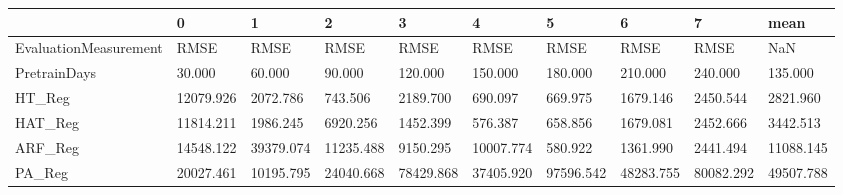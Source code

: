 \begin{tabular}{llllllllll}
\toprule
{} &         0 &         1 &         2 &         3 &         4 &         5 &         6 &         7 &      mean \\
\midrule
EvaluationMeasurement &      RMSE &      RMSE &      RMSE &      RMSE &      RMSE &      RMSE &      RMSE &      RMSE &       NaN \\
PretrainDays          &    30.000 &    60.000 &    90.000 &   120.000 &   150.000 &   180.000 &   210.000 &   240.000 &   135.000 \\
HT\_Reg                & 12079.926 &  2072.786 &   743.506 &  2189.700 &   690.097 &   669.975 &  1679.146 &  2450.544 &  2821.960 \\
HAT\_Reg               & 11814.211 &  1986.245 &  6920.256 &  1452.399 &   576.387 &   658.856 &  1679.081 &  2452.666 &  3442.513 \\
ARF\_Reg               & 14548.122 & 39379.074 & 11235.488 &  9150.295 & 10007.774 &   580.922 &  1361.990 &  2441.494 & 11088.145 \\
PA\_Reg                & 20027.461 & 10195.795 & 24040.668 & 78429.868 & 37405.920 & 97596.542 & 48283.755 & 80082.292 & 49507.788 \\
\bottomrule
\end{tabular}
